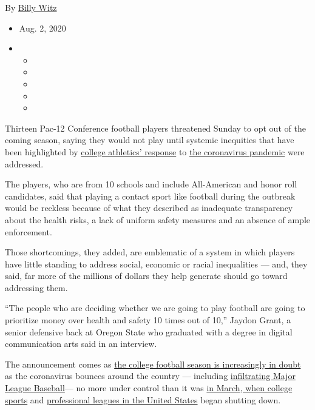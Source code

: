By \href{https://www.nytimes3xbfgragh.onion/by/billy-witz}{Billy Witz}

\begin{itemize}
\item
  Aug. 2, 2020
\item
  \begin{itemize}
  \item
  \item
  \item
  \item
  \item
  \end{itemize}
\end{itemize}

Thirteen Pac-12 Conference football players threatened Sunday to opt out
of the coming season, saying they would not play until systemic
inequities that have been highlighted by
\href{https://www.nytimes3xbfgragh.onion/2020/07/16/sports/ncaafootball/ncaa-guidelines-fall-sports.html}{college
athletics' response} to
\href{https://www.nytimes3xbfgragh.onion/news-event/coronavirus}{the
coronavirus pandemic} were addressed.

The players, who are from 10 schools and include All-American and honor
roll candidates, said that playing a contact sport like football during
the outbreak would be reckless because of what they described as
inadequate transparency about the health risks, a lack of uniform safety
measures and an absence of ample enforcement.

Those shortcomings, they added, are emblematic of a system in which
players have little standing to address social, economic or racial
inequalities --- and, they said, far more of the millions of dollars
they help generate should go toward addressing them.

``The people who are deciding whether we are going to play football are
going to prioritize money over health and safety 10 times out of 10,''
Jaydon Grant, a senior defensive back at Oregon State who graduated with
a degree in digital communication arts said in an interview.

The announcement comes as
\href{https://www.nytimes3xbfgragh.onion/2020/07/10/sports/ncaafootball/coronavirus-college-football-season-canceled.html}{the
college football season is increasingly in doubt} as the coronavirus
bounces around the country --- including
\href{https://www.nytimes3xbfgragh.onion/2020/08/01/sports/baseball/coronavirus-cardinals.html}{infiltrating
Major League Baseball}--- no more under control than it was
\href{https://www.nytimes3xbfgragh.onion/2020/03/12/sports/ncaabasketball/ncaa-basketball-tournament-coronavirus.html}{in
March, when college sports} and
\href{https://www.nytimes3xbfgragh.onion/2020/03/12/sports/coronavirus-sports-canceled.html}{professional
leagues in the United States} began shutting down.

